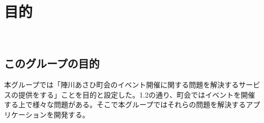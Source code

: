 \chapter{目的}
​
\section{このグループの目的}
本グループでは「陣川あさひ町会のイベント開催に関する問題を解決するサービスの提供をする」ことを目的と設定した。1.2の通り、町会ではイベントを開催する上で様々な問題がある。そこで本グループではそれらの問題を解決するアプリケーションを開発する。
